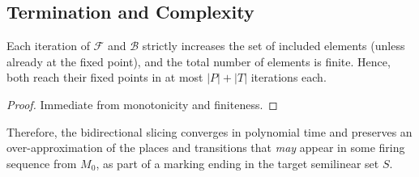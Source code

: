 \subsection{Termination and Complexity}

\begin{lemma}
	Each iteration of $\mathcal{F}$ and $\mathcal{B}$ strictly increases
	the set of included elements (unless already at the fixed point), and
	the total number of elements is finite.  Hence, both reach their
	fixed points in at most $|P|+|T|$ iterations each.
\end{lemma}

\begin{proof}
	Immediate from monotonicity and finiteness.
\end{proof}

\noindent
Therefore, the bidirectional slicing converges in polynomial time and preserves an over-approximation of the
places and transitions that \emph{may} appear in some firing sequence from
$M_0$, as part of a marking ending in the target semilinear set $S$.






